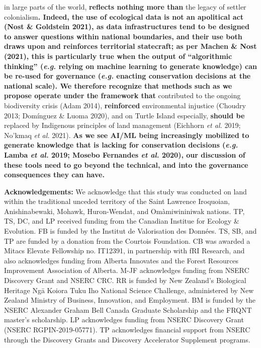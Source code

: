 \documentclass[11pt]{article}
\makeatletter
\def\maxwidth{\ifdim\Gin@nat@width>\linewidth\linewidth
\else\Gin@nat@width\fi}
\let\Oldincludegraphics\includegraphics
\renewcommand{\includegraphics}[1]{\Oldincludegraphics[width=\maxwidth]{#1}}
\providecommand{\DIFaddtex}[1]{{\bf #1}} %
\providecommand{\DIFdeltex}[1]{} %
\providecommand{\DIFaddbegin}{\protect\color{blue}} %
\providecommand{\DIFaddend}{\protect\color{black}} %
\providecommand{\DIFdelbegin}{\protect\color{red}} %
\providecommand{\DIFdelend}{\protect\color{black}} %
\providecommand{\DIFadd}[1]{\texorpdfstring{\DIFaddtex{#1}}{#1}} %
\providecommand{\DIFdel}[1]{\texorpdfstring{\DIFdeltex{#1}}{}} %
\newcommand{\DIFscaledelfig}{0.5}
\newlength{\DIFdelgraphicswidth} %
\newlength{\DIFdelgraphicsheight} %
\newcommand{\DIFaddincludegraphics}[2][]{{\color{blue}\fbox{\DIFOincludegraphics[#1]{#2}}}} %
\newcommand{\DIFdelincludegraphics}[2][]{%
\sbox{\DIFdelgraphicsbox}{\DIFOincludegraphics[#1]{#2}}%
\settoboxwidth{\DIFdelgraphicswidth}{\DIFdelgraphicsbox} %
\settoboxtotalheight{\DIFdelgraphicsheight}{\DIFdelgraphicsbox} %
\scalebox{\DIFscaledelfig}{%
\parbox[b]{\DIFdelgraphicswidth}{\usebox{\DIFdelgraphicsbox}\\[-\baselineskip] \rule{\DIFdelgraphicswidth}{0em}}\llap{\resizebox{\DIFdelgraphicswidth}{\DIFdelgraphicsheight}{%
\setlength{\unitlength}{\DIFdelgraphicswidth}%
\begin{picture}(1,1)%
\thicklines\linethickness{2pt} %
{\color[rgb]{1,0,0}\put(0,0){\framebox(1,1){}}}%
{\color[rgb]{1,0,0}\put(0,0){\line( 1,1){1}}}%
{\color[rgb]{1,0,0}\put(0,1){\line(1,-1){1}}}%
\end{picture}%
}\hspace*{3pt}}} %
} %
\DeclareRobustCommand{\DIFaddbegin}{\DIFOaddbegin \let\includegraphics\DIFaddincludegraphics} %
\DeclareRobustCommand{\DIFaddend}{\DIFOaddend \let\includegraphics\DIFOincludegraphics} %
\DeclareRobustCommand{\DIFdelbegin}{\DIFOdelbegin \let\includegraphics\DIFdelincludegraphics} %
\DeclareRobustCommand{\DIFdelend}{\DIFOaddend \let\includegraphics\DIFOincludegraphics} %
\makeatother
\begin{document}
in large parts of the world, \DIFdelbegin \DIFdel{reflect nothing except for }\DIFdelend \DIFaddbegin \DIFadd{reflects nothing more than }\DIFaddend the legacy of
settler colonialism\DIFdelbegin \DIFdel{, and operating under them
must be done under the clear realization that
they }\DIFdelend \DIFaddbegin \DIFadd{. Indeed, the use of ecological data is not an
apolitical act (Nost \& Goldstein 2021), as data infrastructures tend to
be designed to answer questions within national boundaries, and their
use both draws upon and reinforces territorial statecraft; as per Machen
\& Nost (2021), this is particularly true when the output of
``algorithmic thinking'' (\emph{e.g.} relying on machine learning to
generate knowledge) can be re-used for governance (\emph{e.g.} enacting
conservation decisions at the national scale). We therefore recognize
that methods such as we propose operate under the framework that
}\DIFaddend contributed to the ongoing biodiversity crisis (Adam 2014), \DIFdelbegin \DIFdel{can reinforce }\DIFdelend \DIFaddbegin \DIFadd{reinforced
}\DIFaddend environmental injustice (Choudry 2013; Domínguez \& Luoma 2020), and on
Turtle Island especially, \DIFdelbegin \DIFdel{will probably end up being }\DIFdelend \DIFaddbegin \DIFadd{should be }\DIFaddend replaced by Indigenous principles of
land management (Eichhorn \emph{et al.} 2019; No'kmaq \emph{et al.}
2021). \DIFaddbegin \DIFadd{As we see AI/ML being increasingly mobilized to generate
knowledge that is lacking for conservation decisions (\emph{e.g.} Lamba
\emph{et al.} 2019; Mosebo Fernandes \emph{et al.} 2020), our discussion
of these tools need to go beyond the technical, and into the governance
consequences they can have.
}\DIFaddend 

\textbf{Acknowledgements:} We acknowledge that this study was conducted
on land within the traditional unceded territory of the Saint Lawrence
Iroquoian, Anishinabewaki, Mohawk, Huron-Wendat, and Omàmiwininiwak
nations. TP, TS, DC, and LP received funding from the Canadian Institue
for Ecology \& Evolution. FB is funded by the Institut de Valorisation
des Données. TS, SB, and TP are funded by a donation from the Courtois
Foundation. CB was awarded a Mitacs Elevate Fellowship no. IT12391, in
partnership with fRI Research, and also acknowledges funding from
Alberta Innovates and the Forest Resources Improvement Association of
Alberta. M-JF acknowledges funding from NSERC Discovery Grant and NSERC
CRC. RR is funded by New Zealand's Biological Heritage Ngā Koiora Tuku
Iho National Science Challenge, administered by New Zealand Ministry of
Business, Innovation, and Employment. BM is funded by the NSERC
Alexander Graham Bell Canada Graduate Scholarship and the FRQNT master's
scholarship. LP acknowledges funding from NSERC Discovery Grant (NSERC
RGPIN-2019-05771). TP acknowledges financial support from NSERC through
the Discovery Grants and Discovery Accelerator Supplement programs.
\end{document}
